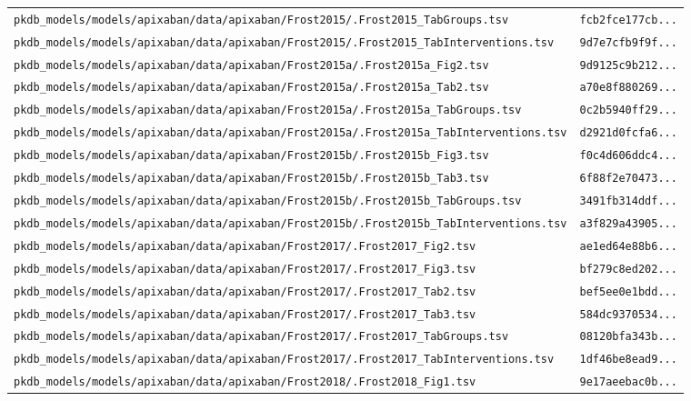 \documentclass{article}
\begin{document}
\begin{longtable}{ll}
\texttt{pkdb\_models/models/apixaban/data/apixaban/Frost2015/.Frost2015\_TabGroups.tsv} & \texttt{fcb2fce177cb...} \\
\texttt{pkdb\_models/models/apixaban/data/apixaban/Frost2015/.Frost2015\_TabInterventions.tsv} & \texttt{9d7e7cfb9f9f...} \\
\texttt{pkdb\_models/models/apixaban/data/apixaban/Frost2015a/.Frost2015a\_Fig2.tsv} & \texttt{9d9125c9b212...} \\
\texttt{pkdb\_models/models/apixaban/data/apixaban/Frost2015a/.Frost2015a\_Tab2.tsv} & \texttt{a70e8f880269...} \\
\texttt{pkdb\_models/models/apixaban/data/apixaban/Frost2015a/.Frost2015a\_TabGroups.tsv} & \texttt{0c2b5940ff29...} \\
\texttt{pkdb\_models/models/apixaban/data/apixaban/Frost2015a/.Frost2015a\_TabInterventions.tsv} & \texttt{d2921d0fcfa6...} \\
\texttt{pkdb\_models/models/apixaban/data/apixaban/Frost2015b/.Frost2015b\_Fig3.tsv} & \texttt{f0c4d606ddc4...} \\
\texttt{pkdb\_models/models/apixaban/data/apixaban/Frost2015b/.Frost2015b\_Tab3.tsv} & \texttt{6f88f2e70473...} \\
\texttt{pkdb\_models/models/apixaban/data/apixaban/Frost2015b/.Frost2015b\_TabGroups.tsv} & \texttt{3491fb314ddf...} \\
\texttt{pkdb\_models/models/apixaban/data/apixaban/Frost2015b/.Frost2015b\_TabInterventions.tsv} & \texttt{a3f829a43905...} \\
\texttt{pkdb\_models/models/apixaban/data/apixaban/Frost2017/.Frost2017\_Fig2.tsv} & \texttt{ae1ed64e88b6...} \\
\texttt{pkdb\_models/models/apixaban/data/apixaban/Frost2017/.Frost2017\_Fig3.tsv} & \texttt{bf279c8ed202...} \\
\texttt{pkdb\_models/models/apixaban/data/apixaban/Frost2017/.Frost2017\_Tab2.tsv} & \texttt{bef5ee0e1bdd...} \\
\texttt{pkdb\_models/models/apixaban/data/apixaban/Frost2017/.Frost2017\_Tab3.tsv} & \texttt{584dc9370534...} \\
\texttt{pkdb\_models/models/apixaban/data/apixaban/Frost2017/.Frost2017\_TabGroups.tsv} & \texttt{08120bfa343b...} \\
\texttt{pkdb\_models/models/apixaban/data/apixaban/Frost2017/.Frost2017\_TabInterventions.tsv} & \texttt{1df46be8ead9...} \\
\texttt{pkdb\_models/models/apixaban/data/apixaban/Frost2018/.Frost2018\_Fig1.tsv} & \texttt{9e17aeebac0b...} \\

\end{longtable}
\end{document}
